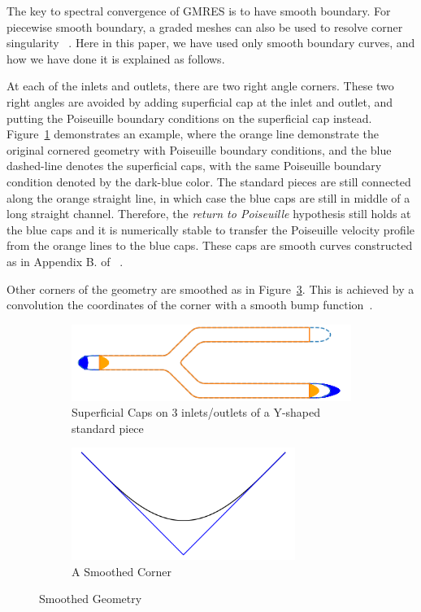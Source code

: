 \documentclass[10pt,twocolumn,letterpaper]{article}
\begin{document}
The key to spectral convergence of GMRES is to have smooth boundary. 
For piecewise smooth boundary, 
a graded meshes can also be used to resolve corner singularity
~\cite{wuSolutionStokesFlow2020}. 
Here in this paper, we have used only smooth boundary curves, 
and how we have done it is explained as follows.

At each of the inlets and outlets, there are two right angle corners. 
These two right angles are avoided by adding superficial cap at the inlet and outlet, 
and putting the Poiseuille boundary conditions on the superficial cap instead. 
Figure~\ref{fig:superficial-cap} demonstrates an example, 
where the orange line demonstrate the original cornered geometry with Poiseuille boundary
conditions, and the blue dashed-line denotes the superficial caps, 
with the same Poiseuille boundary condition denoted by the dark-blue color. 
The standard pieces are still connected along the orange straight line, 
in which case the blue caps are still in middle of a long straight channel. 
Therefore, the \textit{return to Poiseuille} hypothesis still holds at the 
blue caps and it is numerically stable to 
transfer the Poiseuille velocity profile from the orange lines 
to the blue caps. 
These caps are smooth curves constructed as in Appendix B. of
~\cite{baggeHighlyAccurateSpecial2021}. 

Other corners of the geometry are smoothed as in Figure~\ref{fig:smooth-corner}. 
This is achieved by a convolution the coordinates of the corner 
with a smooth bump function~\cite{epsteinSmoothedCornersScattered2016}.

\begin{figure}[!ht]
  \centering
  \begin{subfigure}[b]{0.4\textwidth}
    \includegraphics[width=\textwidth]{pic/superficial_cap_demo.png}  
    \caption{Superficial Caps on 3 inlets/outlets of a Y-shaped standard piece}\label{fig:superficial-cap}
  \end{subfigure}
  \begin{subfigure}[b]{0.4\textwidth}
    \includegraphics[width=0.8\textwidth]{pic/smoothed_corner.png}
    \caption{A Smoothed Corner}\label{fig:smooth-corner}
  \end{subfigure}
  \caption{Smoothed Geometry}
\end{figure}
\end{document}
